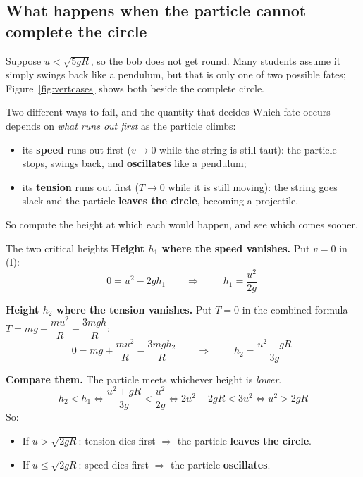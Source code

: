 \subsection{What happens when the particle cannot complete the circle}\label{sub:vcfail}
Suppose $u<\sqrt{5gR}$, so the bob does not get round. Many students assume it simply swings back
like a pendulum, but that is only one of two possible fates; Figure~\ref{fig:vertcases} shows both beside the complete circle.

\begin{motivbox}{Two different ways to fail, and the quantity that decides}
Which fate occurs depends on \emph{what runs out first} as the particle climbs:
\begin{itemize}
\item its \textbf{speed} runs out first ($v\to0$ while the string is still taut): the particle
      stops, swings back, and \textbf{oscillates} like a pendulum;
\item its \textbf{tension} runs out first ($T\to0$ while it is still moving): the string goes slack
      and the particle \textbf{leaves the circle}, becoming a projectile.
\end{itemize}
So compute the height at which each would happen, and see which comes sooner.
\end{motivbox}

\begin{derivbox}{The two critical heights}
 \textbf{Height $h_1$ where the speed vanishes.} Put $v=0$ in (I):
\[
0=u^{2}-2gh_1
\qquad\Longrightarrow\qquad
\boxed{\;h_1=\frac{u^{2}}{2g}\;}
\]

 \textbf{Height $h_2$ where the tension vanishes.} Put $T=0$ in the combined formula
$T=mg+\dfrac{mu^{2}}{R}-\dfrac{3mgh}{R}$:
\[
0=mg+\frac{mu^{2}}{R}-\frac{3mgh_2}{R}
\qquad\Longrightarrow\qquad
\boxed{\;h_2=\frac{u^{2}+gR}{3g}\;}
\]

 \textbf{Compare them.} The particle meets whichever height is \emph{lower}.
\[
h_2<h_1
\iff
\frac{u^{2}+gR}{3g}<\frac{u^{2}}{2g}
\iff
2u^{2}+2gR<3u^{2}
\iff
\boxed{u^{2}>2gR}
\]
So:
\begin{itemize}
\item If $u>\sqrt{2gR}$: tension dies first $\Rightarrow$ the particle \textbf{leaves the circle}.
\item If $u\le\sqrt{2gR}$: speed dies first $\Rightarrow$ the particle \textbf{oscillates}.
\end{itemize}
\end{derivbox}


